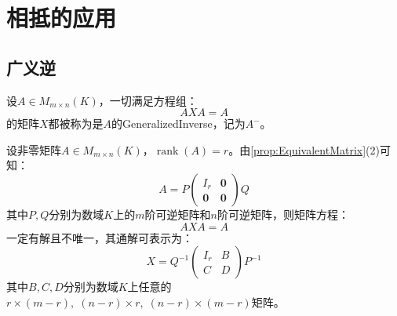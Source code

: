 \section{相抵的应用}

\subsection{广义逆}
\begin{definition}
	设$A\in M_{m\times n}(K)$，一切满足方程组：
	\begin{equation*}
		AXA=A
	\end{equation*}
	的矩阵$X$都被称为是$A$的\gls{GeneralizedInverse}，记为$A^-$。
\end{definition}
 \begin{theorem}\label{theo:ExistenceOfGeneralizedInverse}
	设非零矩阵$A\in M_{m\times n}(K)$，$\operatorname{rank}(A)=r$。由\cref{prop:EquivalentMatrix}(2)可知：
	\begin{equation*}
		A=P
		\begin{pmatrix}
			I_r & \mathbf{0} \\
			\mathbf{0} & \mathbf{0}
		\end{pmatrix}
		Q
	\end{equation*}
	其中$P,Q$分别为数域$K$上的$m$阶可逆矩阵和$n$阶可逆矩阵，则矩阵方程：
	\begin{equation*}
		AXA=A
	\end{equation*}
	一定有解且不唯一，其通解可表示为：
	\begin{equation*}
		X=Q^{-1}
		\begin{pmatrix}
			I_r & B \\
			C & D
		\end{pmatrix}
		P^{-1}
	\end{equation*}
	其中$B,C,D$分别为数域$K$上任意的$r\times (m-r),\;(n-r)\times r,\;(n-r)\times(m-r)$矩阵。
\end{theorem}
